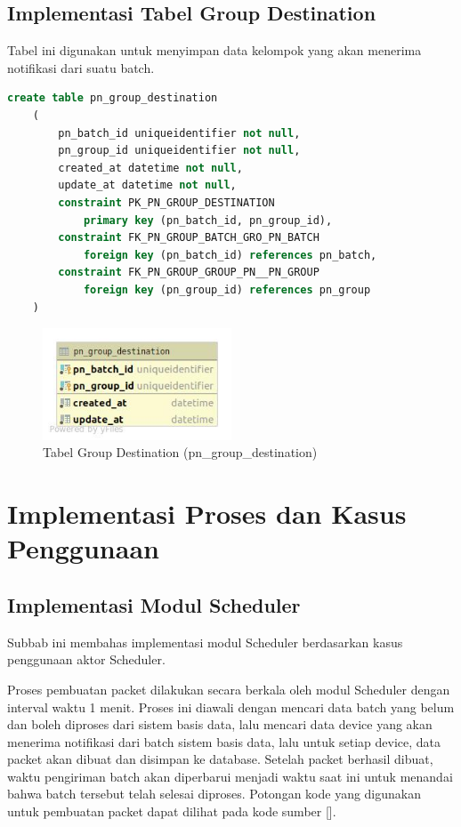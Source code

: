 \subsection{Implementasi Tabel Group Destination}
\par Tabel ini digunakan untuk menyimpan data kelompok yang akan menerima notifikasi dari suatu batch.
\begin{lstlisting}[language=sql, firstnumber=1, caption=Implementasi Tabel Group Destination]
    create table pn_group_destination
    (
        pn_batch_id uniqueidentifier not null,
        pn_group_id uniqueidentifier not null,
        created_at datetime not null,
        update_at datetime not null,
        constraint PK_PN_GROUP_DESTINATION
            primary key (pn_batch_id, pn_group_id),
        constraint FK_PN_GROUP_BATCH_GRO_PN_BATCH
            foreign key (pn_batch_id) references pn_batch,
        constraint FK_PN_GROUP_GROUP_PN__PN_GROUP
            foreign key (pn_group_id) references pn_group
    )
\end{lstlisting}
\begin{figure}[H]
    \centering\includegraphics[width=0.5\textwidth]{bab4/figures/tabel_pn_group_destination.jpg}
    \caption{Tabel Group Destination (pn\_group\_destination)}
    \label{tabel_pn_group_destination}
\end{figure}

\section{Implementasi Proses dan Kasus Penggunaan}

\subsection{Implementasi Modul Scheduler}
\par Subbab ini membahas implementasi modul Scheduler berdasarkan kasus penggunaan aktor Scheduler.

\par Proses pembuatan packet dilakukan secara berkala oleh modul Scheduler dengan interval waktu 1 menit.
Proses ini diawali dengan mencari data batch yang belum dan boleh diproses dari sistem basis data,
lalu mencari data device yang akan menerima notifikasi dari batch sistem basis data,
lalu untuk setiap device, data packet akan dibuat dan disimpan ke database.
Setelah packet berhasil dibuat, waktu pengiriman batch akan diperbarui menjadi waktu saat ini untuk menandai bahwa
batch tersebut telah selesai diproses.
Potongan kode yang digunakan untuk pembuatan packet dapat dilihat pada kode sumber [].
